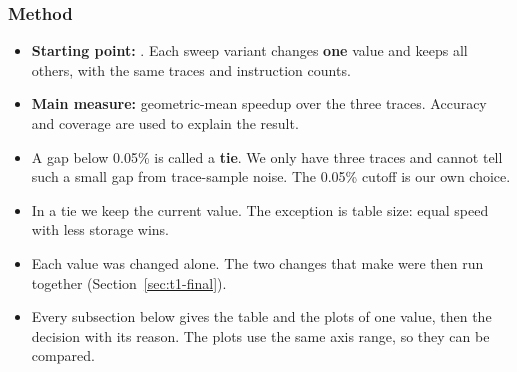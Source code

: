 \subsubsection{Method}
\begin{itemize}
  \item \textbf{Starting point:} . Each sweep variant changes \textbf{one} value and keeps all others,
        with the same traces and instruction counts.
  \item \textbf{Main measure:} geometric-mean speedup over the three traces. Accuracy and coverage are used to explain the result.
  \item A gap below 0.05\% is called a \textbf{tie}. We only have three traces and cannot tell such a small gap from
        trace-sample noise. The 0.05\% cutoff is our own choice.
  \item In a tie we keep the current value. The exception is table size: equal speed with less storage wins.
  \item Each value was changed alone. The two changes that make  were then run together (Section~\ref{sec:t1-final}).
  \item Every subsection below gives the table and the plots of one value, then the decision with its reason.
        The plots use the same axis range, so they can be compared.
\end{itemize}

\newcommand{\swhead}{\toprule Variant & Value & Speedup T1 & Speedup T2 & Speedup T3 & Geomean speedup & Mean acc (\%) & Mean cov (\%) \\ \midrule}
\newcommand{\swtab}[2]{%
  \begin{table}[H]\centering\small
  \begin{tabular}{@{}llcccccc@{}}\swhead #1 \bottomrule\end{tabular}
  \caption{#2 Only this value changes; bold row = \code{SPP-AC}.}
  \end{table}}
\newcommand{\acrow}{\best\textbf{\code{SPP-AC}}}
\newcommand{\acvals}{1.0094 & 1.0102 & 1.0128 & 1.01079 & 52.58 & 7.92}

